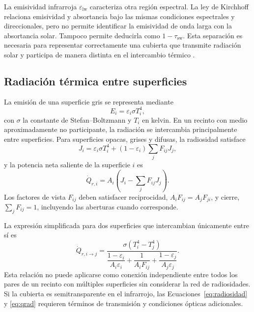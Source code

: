 La emisividad infrarroja $\varepsilon_{\mathrm{lw}}$ caracteriza otra región espectral. La ley de Kirchhoff relaciona emisividad y absortancia bajo las mismas condiciones espectrales y direccionales, pero no permite identificar la emisividad de onda larga con la absortancia solar. Tampoco permite deducirla como $1-\tau_{\mathrm{sw}}$. Esta separación es necesaria para representar correctamente una cubierta que transmite radiación solar y participa de manera distinta en el intercambio térmico \cite{duffie2013,bergman2017}.



\subsection{Radiación térmica entre superficies}

La emisión de una superficie gris se representa mediante
\begin{equation}
E_i=\varepsilon_i\sigma T_i^4,
\label{eq:stefan}
\end{equation}
con $\sigma$ la constante de Stefan--Boltzmann y $T_i$ en kelvin. En un recinto con medio aproximadamente no participante, la radiación se intercambia principalmente entre superficies. Para superficies opacas, grises y difusas, la radiosidad satisface
\begin{equation}
J_i=\varepsilon_i\sigma T_i^4
+(1-\varepsilon_i)\sum_jF_{ij}J_j,
\label{eq:radiosidad}
\end{equation}
y la potencia neta saliente de la superficie $i$ es
\begin{equation}
\dot Q_{r,i}=A_i\left(J_i-\sum_jF_{ij}J_j\right).
\label{eq:potencia_radiosidad}
\end{equation}
Los factores de vista $F_{ij}$ deben satisfacer reciprocidad, $A_iF_{ij}=A_jF_{ji}$, y cierre, $\sum_jF_{ij}=1$, incluyendo las aberturas cuando corresponde.

La expresión simplificada para dos superficies que intercambian únicamente entre sí es
\begin{equation}
\dot Q_{r,i\rightarrow j}=
\frac{\sigma(T_i^4-T_j^4)}
{\dfrac{1-\varepsilon_i}{A_i\varepsilon_i}
+\dfrac{1}{A_iF_{ij}}
+\dfrac{1-\varepsilon_j}{A_j\varepsilon_j}}.
\label{eq:qrad}
\end{equation}
Esta relación no puede aplicarse como conexión independiente entre todos los pares de un recinto con múltiples superficies sin considerar la red de radiosidades. Si la cubierta es semitransparente en el infrarrojo, las Ecuaciones~\eqref{eq:radiosidad} y \eqref{eq:qrad} requieren términos de transmisión y condiciones ópticas adicionales.

